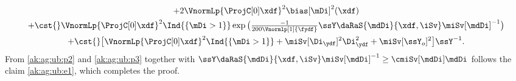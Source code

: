 \begin{pro}
\begin{multline}
    +2\VnormLp{\ProjC[0]\xdf}^2\bias[\mDi]^2(\xdf)
    \\\hfill
 + \cst{}\VnormLp{\ProjC[0]\xdf}^2\Ind{\{\mDi>1\}}
 \exp\big(\tfrac{-1}{200\Vnormlp[1]{\fydf}}\ssY\daRaS{\mdDi}{\xdf,\iSv}\miSv[\mdDi]^{-1}\big)
 \\
 +\cst{}\big[
 \VnormLp{\ProjC[0]\xdf}^2\Ind{\{\mDi>1\}}
+\miSv[\Di_{\ydf}]^2\Di_{\ydf}^2+\miSv[\ssY_{o}]^2 \big]\ssY^{-1}.
  \end{multline}  
From \eqref{ak:ag:ub:p2} and \eqref{ak:ag:ub:p3} together with
$\ssY\daRaS{\mdDi}{\xdf,\iSv}\miSv[\mdDi]^{-1}\geq\cmiSv[\mdDi]\mdDi$
follows the claim \eqref{ak:ag:ub:e1}, which  completes the proof.
\proEnd\end{pro}
